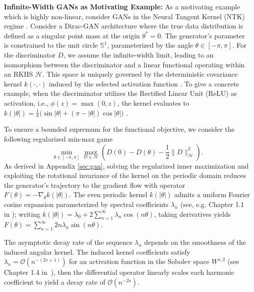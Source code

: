 \documentclass[letter,11pt]{article}
\begin{document}
\noindent\textbf{Infinite-Width GANs as Motivating Example:}
As a motivating example which is highly non-linear, consider GANs in the Neural Tangent Kernel (NTK) regime \cite{jacot2018neural}. Consider a Dirac-GAN architecture \cite{mescheder2018training} where the true data distribution is defined as a singular point mass at the origin $\theta^* = 0$. The generator's parameter is constrained to the unit circle $\mathbb{S}^1$, parameterized by the angle $\theta \in [-\pi, \pi]$. For the discriminator $D$, we assume the infinite-width limit, leading to an isomorphism between the discriminator and a linear functional operating within an RKHS $\mathcal{H}$. This space is uniquely governed by the deterministic covariance kernel $k(\cdot, \cdot)$ induced by the selected activation function \cite{jacot2018neural}. To give a concrete example, when the discriminator utilizes the Rectified Linear Unit (ReLU) as activation, i.e., $\phi(z) = \max(0, z)$, the kernel evaluates to
$k(|\theta|) = \frac{1}{\pi} \big( \sin |\theta| + (\pi - |\theta|) \cos |\theta| \big)$ \cite{arora2019fine,li2019enhanced,golikov2022neural}.

To ensure a bounded supremum for the functional objective, we consider the following regularized min-max game
\begin{equation}
\min_{\theta \in [-\pi, \pi]} \max_{D \in \mathcal{H}} \left( D(0) - D(\theta) - \frac{1}{2}\|D\|_{\mathcal{H}}^2 \right).
\end{equation}
As derived in Appendix \ref{sec:gan}, solving the regularized inner maximization and exploiting the rotational invariance of the kernel on the periodic domain reduces the generator's trajectory to the gradient flow with operator $F(\theta) = -\nabla_\theta k(|\theta|).$
The even periodic kernel $k(|\theta|)$ admits a uniform Fourier cosine expansion parameterized by spectral coefficients $\lambda_n$ (see, e.g. Chapter 1.1 in \cite{katznelson2004introduction}); writing $k(|\theta|)=\lambda_0+2\sum_{n=1}^{\infty}\lambda_n\cos(n\theta)$, taking derivatives yields $F(\theta) = \sum_{n=1}^\infty 2n \lambda_n \sin(n \theta).$

The asymptotic decay rate of the sequence $\lambda_n$ depends on the smoothness of the induced angular kernel. The induced kernel coefficients satisfy $\lambda_n=\mathcal{O}(n^{-(2s+1)})$ for an activation function in the Sobolev space $W^{s,2}$ (see Chapter 1.4 in~\cite{katznelson2004introduction}), then the differential operator linearly scales each harmonic coefficient to yield a decay rate of $\mathcal{O}(n^{-2s})$.
\end{document}
